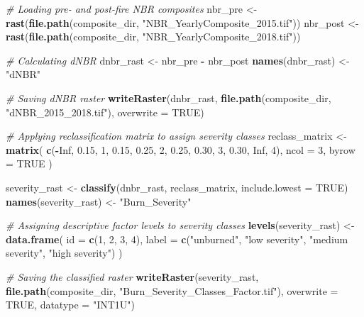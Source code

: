 \documentclass[
]{article}
\newenvironment{Shaded}{\begin{snugshade}}{\end{snugshade}}
\newcommand{\AttributeTok}[1]{\textcolor[rgb]{0.13,0.29,0.53}{#1}}
\newcommand{\CommentTok}[1]{\textcolor[rgb]{0.56,0.35,0.01}{\textit{#1}}}
\newcommand{\ConstantTok}[1]{\textcolor[rgb]{0.56,0.35,0.01}{#1}}
\newcommand{\DecValTok}[1]{\textcolor[rgb]{0.00,0.00,0.81}{#1}}
\newcommand{\FloatTok}[1]{\textcolor[rgb]{0.00,0.00,0.81}{#1}}
\newcommand{\FunctionTok}[1]{\textcolor[rgb]{0.13,0.29,0.53}{\textbf{#1}}}
\newcommand{\NormalTok}[1]{#1}
\newcommand{\OtherTok}[1]{\textcolor[rgb]{0.56,0.35,0.01}{#1}}
\newcommand{\SpecialCharTok}[1]{\textcolor[rgb]{0.81,0.36,0.00}{\textbf{#1}}}
\newcommand{\StringTok}[1]{\textcolor[rgb]{0.31,0.60,0.02}{#1}}
\begin{document}
\begin{Shaded}
\begin{Highlighting}[]
\CommentTok{\# Loading pre{-} and post{-}fire NBR composites}
\NormalTok{nbr\_pre  }\OtherTok{\textless{}{-}} \FunctionTok{rast}\NormalTok{(}\FunctionTok{file.path}\NormalTok{(composite\_dir, }\StringTok{"NBR\_YearlyComposite\_2015.tif"}\NormalTok{))}
\NormalTok{nbr\_post }\OtherTok{\textless{}{-}} \FunctionTok{rast}\NormalTok{(}\FunctionTok{file.path}\NormalTok{(composite\_dir, }\StringTok{"NBR\_YearlyComposite\_2018.tif"}\NormalTok{))}

\CommentTok{\# Calculating dNBR}
\NormalTok{dnbr\_rast       }\OtherTok{\textless{}{-}}\NormalTok{ nbr\_pre }\SpecialCharTok{{-}}\NormalTok{ nbr\_post}
\FunctionTok{names}\NormalTok{(dnbr\_rast) }\OtherTok{\textless{}{-}} \StringTok{"dNBR"}

\CommentTok{\# Saving dNBR raster}
\FunctionTok{writeRaster}\NormalTok{(dnbr\_rast,}
            \FunctionTok{file.path}\NormalTok{(composite\_dir, }\StringTok{"dNBR\_2015\_2018.tif"}\NormalTok{),}
            \AttributeTok{overwrite =} \ConstantTok{TRUE}\NormalTok{)}

\CommentTok{\# Applying reclassification matrix to assign severity classes}
\NormalTok{reclass\_matrix }\OtherTok{\textless{}{-}} \FunctionTok{matrix}\NormalTok{(}
  \FunctionTok{c}\NormalTok{(}\SpecialCharTok{{-}}\ConstantTok{Inf}\NormalTok{, }\FloatTok{0.15}\NormalTok{,  }\DecValTok{1}\NormalTok{,}
    \FloatTok{0.15}\NormalTok{, }\FloatTok{0.25}\NormalTok{,  }\DecValTok{2}\NormalTok{,}
    \FloatTok{0.25}\NormalTok{, }\FloatTok{0.30}\NormalTok{,  }\DecValTok{3}\NormalTok{,}
    \FloatTok{0.30}\NormalTok{,  }\ConstantTok{Inf}\NormalTok{,  }\DecValTok{4}\NormalTok{),}
  \AttributeTok{ncol =} \DecValTok{3}\NormalTok{, }\AttributeTok{byrow =} \ConstantTok{TRUE}
\NormalTok{)}

\NormalTok{severity\_rast        }\OtherTok{\textless{}{-}} \FunctionTok{classify}\NormalTok{(dnbr\_rast, reclass\_matrix, }\AttributeTok{include.lowest =} \ConstantTok{TRUE}\NormalTok{)}
\FunctionTok{names}\NormalTok{(severity\_rast) }\OtherTok{\textless{}{-}} \StringTok{"Burn\_Severity"}

\CommentTok{\# Assigning descriptive factor levels to severity classes}
\FunctionTok{levels}\NormalTok{(severity\_rast) }\OtherTok{\textless{}{-}} \FunctionTok{data.frame}\NormalTok{(}
  \AttributeTok{id    =} \FunctionTok{c}\NormalTok{(}\DecValTok{1}\NormalTok{, }\DecValTok{2}\NormalTok{, }\DecValTok{3}\NormalTok{, }\DecValTok{4}\NormalTok{),}
  \AttributeTok{label =} \FunctionTok{c}\NormalTok{(}\StringTok{"unburned"}\NormalTok{, }\StringTok{"low severity"}\NormalTok{, }\StringTok{"medium severity"}\NormalTok{, }\StringTok{"high severity"}\NormalTok{)}
\NormalTok{)}

\CommentTok{\# Saving the classified raster}
\FunctionTok{writeRaster}\NormalTok{(severity\_rast,}
            \FunctionTok{file.path}\NormalTok{(composite\_dir, }\StringTok{"Burn\_Severity\_Classes\_Factor.tif"}\NormalTok{),}
            \AttributeTok{overwrite =} \ConstantTok{TRUE}\NormalTok{, }\AttributeTok{datatype =} \StringTok{"INT1U"}\NormalTok{)}
\end{Highlighting}
\end{Shaded}
\end{document}
